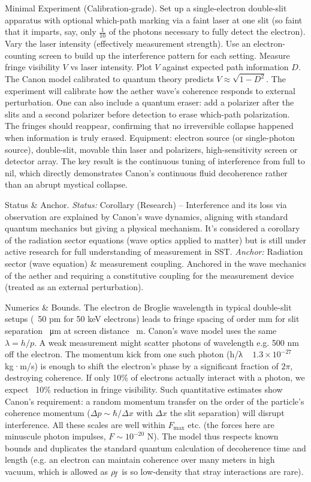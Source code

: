 \documentclass[11pt]{article}
\begin{document}
Minimal Experiment (Calibration-grade). Set up a single-electron double-slit apparatus with optional which-path marking via a faint laser at one slit (so faint that it imparts, say, only $\frac{1}{10}$ of the photons necessary to fully detect the electron). Vary the laser intensity (effectively measurement strength). Use an electron-counting screen to build up the interference pattern for each setting. Measure fringe visibility $V$ vs laser intensity. Plot $V$ against expected path information $D$. The Canon model calibrated to quantum theory predicts $V \approx \sqrt{1-D^2}$. The experiment will calibrate how the aether wave’s coherence responds to external perturbation. One can also include a quantum eraser: add a polarizer after the slits and a second polarizer before detection to erase which-path polarization. The fringes should reappear, confirming that no irreversible collapse happened when information is truly erased. Equipment: electron source (or single-photon source), double-slit, movable thin laser and polarizers, high-sensitivity screen or detector array. The key result is the continuous tuning of interference from full to nil, which directly demonstrates Canon’s continuous fluid decoherence rather than an abrupt mystical collapse.


Status & Anchor. \textit{Status:} Corollary (Research) – Interference and its loss via observation are explained by Canon’s wave dynamics, aligning with standard quantum mechanics but giving a physical mechanism. It’s considered a corollary of the radiation sector equations (wave optics applied to matter) but is still under active research for full understanding of measurement in SST. \textit{Anchor:} Radiation sector (wave equation) & measurement coupling. Anchored in the wave mechanics of the aether and requiring a constitutive coupling for the measurement device (treated as an external perturbation).


Numerics & Bounds. The electron de Broglie wavelength in typical double-slit setups (~50 pm for 50 keV electrons) leads to fringe spacing of order mm for slit separation ~μm at screen distance ~m. Canon’s wave model uses the same $\lambda = h/p$. A weak measurement might scatter photons of wavelength e.g. 500 nm off the electron. The momentum kick from one such photon (h/λ ~ $1.3\times10^{-27}$ kg·m/s) is enough to shift the electron’s phase by a significant fraction of $2\pi$, destroying coherence. If only 10\% of electrons actually interact with a photon, we expect ~10\% reduction in fringe visibility. Such quantitative estimates show Canon’s requirement: a random momentum transfer on the order of the particle’s coherence momentum ($\Delta p \sim \hbar/\Delta x$ with $\Delta x$ the slit separation) will disrupt interference. All these scales are well within $F_{\max}$ etc. (the forces here are minuscule photon impulses, $F \sim 10^{-20}$ N). The model thus respects known bounds and duplicates the standard quantum calculation of decoherence time and length (e.g. an electron can maintain coherence over many meters in high vacuum, which is allowed as $\rho_{\!f}$ is so low-density that stray interactions are rare).
\end{document}
